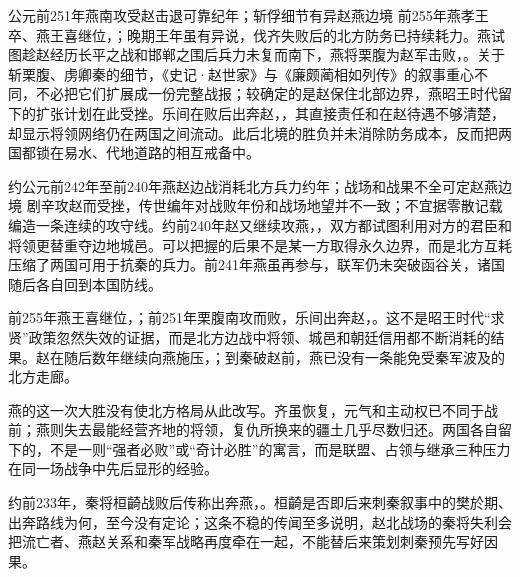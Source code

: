 \begin{event}{公元前251年}{燕南攻受赵击退}{可靠纪年；斩俘细节有异}{赵燕边境}
前255年燕孝王卒、燕王喜继位，；晚期王年虽有异说，伐齐失败后的北方防务已持续耗力。燕试图趁赵经历长平之战和邯郸之围后兵力未复而南下，燕将栗腹为赵军击败，。关于斩栗腹、虏卿秦的细节，《史记·赵世家》与《廉颇蔺相如列传》的叙事重心不同，不必把它们扩展成一份完整战报；较确定的是赵保住北部边界，燕昭王时代留下的扩张计划在此受挫。乐间在败后出奔赵，，其直接责任和在赵待遇不够清楚，却显示将领网络仍在两国之间流动。此后北境的胜负并未消除防务成本，反而把两国都锁在易水、代地道路的相互戒备中。
\end{event}

\begin{event}{约公元前242年至前240年}{燕赵边战消耗北方兵力}{约年；战场和战果不全可定}{赵燕边境}
剧辛攻赵而受挫，传世编年对战败年份和战场地望并不一致；不宜据零散记载编造一条连续的攻守线。约前240年赵又继续攻燕，，双方都试图利用对方的君臣和将领更替重夺边地城邑。可以把握的后果不是某一方取得永久边界，而是北方互耗压缩了两国可用于抗秦的兵力。前241年燕虽再参与，联军仍未突破函谷关，诸国随后各自回到本国防线。
\end{event}

前255年燕王喜继位，；前251年栗腹南攻而败，乐间出奔赵，。这不是昭王时代“求贤”政策忽然失效的证据，而是北方边战中将领、城邑和朝廷信用都不断消耗的结果。赵在随后数年继续向燕施压，；到秦破赵前，燕已没有一条能免受秦军波及的北方走廊。

燕的这一次大胜没有使北方格局从此改写。齐虽恢复，元气和主动权已不同于战前；燕则失去最能经营齐地的将领，复仇所换来的疆土几乎尽数归还。两国各自留下的，不是一则“强者必败”或“奇计必胜”的寓言，而是联盟、占领与继承三种压力在同一场战争中先后显形的经验。

约前233年，秦将桓齮战败后传称出奔燕，。桓齮是否即后来刺秦叙事中的樊於期、出奔路线为何，至今没有定论；这条不稳的传闻至多说明，赵北战场的秦将失利会把流亡者、燕赵关系和秦军战略再度牵在一起，不能替后来策划刺秦预先写好因果。

